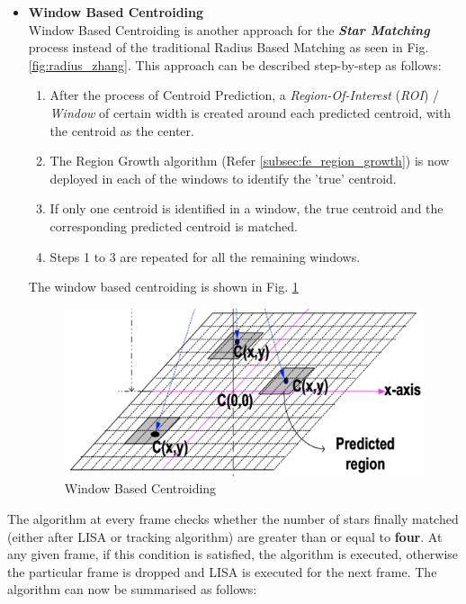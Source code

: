\documentclass[../../main.tex]{subfiles}
\begin{document}
\begin{itemize}
     \item \textbf{Window Based Centroiding}\\ \label{subsec:window_matching}
     Window Based Centroiding is another approach for the \textbf{\emph{Star Matching}} process instead of the traditional Radius Based Matching as seen in Fig. \ref{fig:radius_zhang}. This approach can be described step-by-step as follows:
     \begin{enumerate}
         \item  After the process of Centroid Prediction, a \emph{Region-Of-Interest} (\emph{ROI}) / \emph{Window} of certain width is created around each predicted centroid, with the centroid as the center.
         \item The Region Growth algorithm (Refer \ref{subsec:fe_region_growth}) is now deployed in each of the windows to identify the 'true' centroid. 
         \item If only one centroid is identified in a window, the true centroid and the corresponding predicted centroid is matched.
         \item Steps 1 to 3 are repeated for all the remaining windows. 
     \end{enumerate}
     The window based centroiding is shown in Fig. \ref{fig:window_matching}
     \begin{figure}[!h]
        \centering
        \includegraphics[scale=0.4]{Figures/GNC/window_matching.png}
        \caption{Window Based Centroiding}
        \label{fig:window_matching}
    \end{figure}
\end{itemize}
The algorithm at every frame checks whether the number of stars finally matched (either after LISA or tracking algorithm) are greater than or equal to \textbf{four}. At any given frame, if this condition is satisfied, the algorithm is executed, otherwise the particular frame is dropped and LISA is executed for the next frame. The algorithm can now be summarised as follows:
\end{document}
